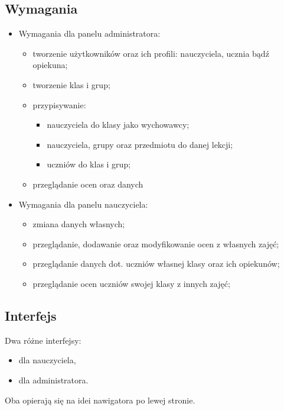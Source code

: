 \documentclass[12pt, titlepage]{article}
\begin{document}
\subsection{Wymagania}
\begin{itemize}
\item Wymagania dla panelu administratora:
	\begin{itemize}
	\item tworzenie użytkowników oraz ich profili: nauczyciela, ucznia bądź opiekuna; 
	\item tworzenie klas i grup;
	\item przypisywanie: 
		\begin{itemize}
			\item nauczyciela do klasy jako wychowawcy;
			\item nauczyciela, grupy oraz przedmiotu do danej lekcji;
			\item uczniów do klas i grup;
		\end{itemize}
	\item przeglądanie ocen oraz danych 
	\end{itemize}
\item Wymagania dla panelu nauczyciela:
	\begin{itemize}
		\item zmiana danych własnych;
		\item przeglądanie, dodawanie oraz modyfikowanie ocen z własnych zajęć;
		\item przeglądanie danych dot. uczniów własnej klasy oraz ich opiekunów;
		\item przeglądanie ocen uczniów swojej klasy z innych zajęć;
	\end{itemize}
\end{itemize}
\subsection{Interfejs}
Dwa różne interfejsy:
\begin{itemize}
	\item dla nauczyciela,
	\item dla administratora.
\end{itemize}
Oba opierają się na idei nawigatora po lewej stronie.
\end{document}
